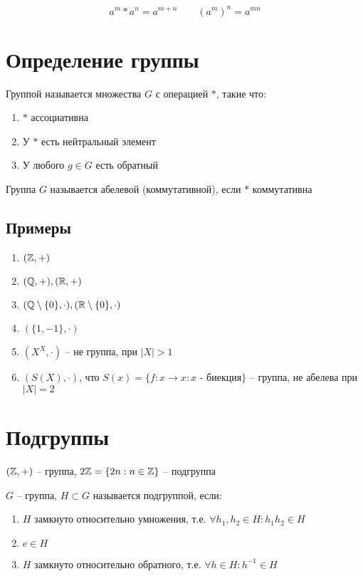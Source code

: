 \documentclass[main]{subfiles}
\begin{document}
\[a^m * a^n = a^{m+n} \qquad (a^m)^n = a^ {mn}\]

\section{Определение группы}

\begin{definition}
    Группой называется множества $G$ с операцией $*$, такие что:
    \begin{enumerate}
        \item $*$ ассоциативна
        \item У $*$ есть нейтральный элемент
        \item У любого $g\in G$ есть обратный
    \end{enumerate}
    Группа $G$ называется абелевой (коммутативной), если $*$ коммутативна
\end{definition}

\subsection{Примеры}
\begin{enumerate}
    \item $(\mathbb{Z}, +)$
    \item $(\mathbb{Q}, +), (\mathbb{R}, +)$
    \item $(\mathbb{Q} \setminus \{0\}, \cdot), (\mathbb{R} \setminus \{0\}, \cdot)$
    \item $(\{1, -1\}, \cdot)$
    \item $(X^X, \cdot)$ -- не группа, при $|X| > 1$
    \item $(S(X), \cdot)$, что
          $S(x)=\{f:x\to x : x \text{ - биекция}\}$ -- группа,
          не абелева при $|X| = 2$
\end{enumerate}

\section{Подгруппы}

\begin{example}
    $(\mathbb{Z}, +)$ -- группа, $2\mathbb{Z} = \{2n: n \in \mathbb{Z}\}$ -- подгруппа
\end{example}

\begin{definition}
    $G$ -- группа, $H \subset G$ называется подгруппой, если:
    \begin{enumerate}
        \item $H$ замкнуто относительно умножения, т.е. $\forall h_1, h_2 \in H: h_1 h_2 \in H$
        \item $e \in H$
        \item $H$ замкнуто относительно обратного, т.е. $\forall h \in H: h^{-1} \in H$
    \end{enumerate}
\end{definition}
\end{document}
